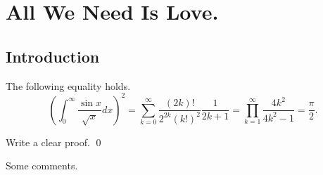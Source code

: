 \documentclass{report}
\begin{document}
\chapter{All We Need Is Love.}
\section{Introduction}
\begin{thm}
	The following equality holds.
	\begin{equation}
		\left( \int_0^\infty \frac{\sin x}{\sqrt x} dx \right)^2 =
		\sum_{k=0}^\infty \frac{(2k)!}{2^{2k}(k!)^2} \frac{1}{2k+1} =
		\prod_{k=1}^\infty \frac{4k^2}{4k^2-1} =
		\frac{\pi}{2}.
	\end{equation}
\end{thm}
\begin{prf}
	Write a clear proof.
	\qed\end{prf}

\begin{rem}
	Some comments.
	\fin\end{rem}
\end{document}

